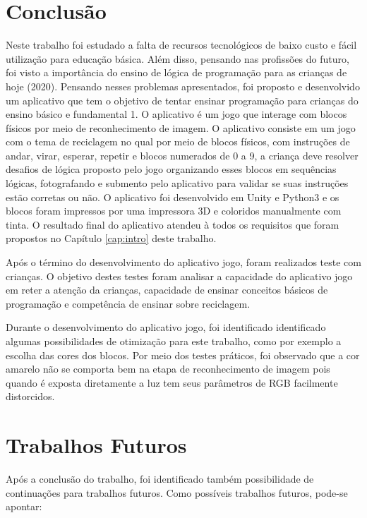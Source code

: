 \section{Conclusão}

Neste trabalho foi estudado a falta de recursos tecnológicos de baixo custo e fácil utilização para educação básica. Além disso, pensando nas profissões do futuro, foi visto a importância do ensino de lógica de programação para as crianças de hoje (2020).
Pensando nesses problemas apresentados, foi proposto e desenvolvido um aplicativo que tem o objetivo de tentar ensinar programação para crianças do ensino básico e fundamental 1. O aplicativo é um jogo que interage com blocos físicos por meio de reconhecimento de imagem. O aplicativo consiste em um jogo com o tema de reciclagem no qual por meio de blocos físicos, com instruções de andar, virar, esperar, repetir e blocos numerados de 0 a 9, a criança deve resolver desafios de lógica proposto pelo jogo organizando esses blocos em sequências lógicas, fotografando e submento pelo aplicativo para validar se suas instruções estão corretas ou não. O aplicativo foi desenvolvido em Unity e Python3 e os blocos foram impressos por uma impressora 3D e coloridos manualmente com tinta. O resultado final do aplicativo atendeu à todos os requisitos que foram propostos no Capítulo \ref{cap:intro} deste trabalho.

Após o término do desenvolvimento do aplicativo jogo, foram realizados teste com crianças. O objetivo destes testes foram analisar a capacidade do aplicativo jogo em reter a atenção da crianças, capacidade de ensinar conceitos básicos de programação e competência de ensinar sobre reciclagem.

Durante o desenvolvimento do aplicativo jogo, foi identificado identificado algumas possibilidades de otimização para este trabalho, como por exemplo a escolha das cores dos blocos. Por meio dos testes práticos, foi observado que a cor amarelo não se comporta bem na etapa de reconhecimento de imagem pois quando é exposta diretamente a luz tem seus parâmetros de RGB facilmente distorcidos.

\clearpage

\section{Trabalhos Futuros}

Após a conclusão do trabalho, foi identificado também possibilidade de continuações para trabalhos futuros. Como possíveis trabalhos futuros, pode-se apontar:

